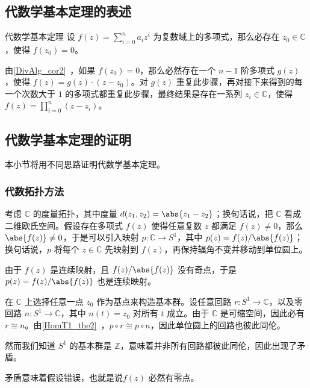 
\begin{issues}
\issueTODO
\end{issues}


\subsection{代数学基本定理的表述}

\begin{definition}{代数学基本定理}
设 $f(z)=\sum\limits_{i=0}^n a_iz^i$ 为复数域上的多项式，那么必存在 $z_0\in\mathbb{C}$，使得 $f(z_0)=0$。
\end{definition}

由\autoref{DivAlg_cor2}~，如果 $f(z_0)=0$，那么必然存在一个 $n-1$ 阶多项式 $g(z)$，使得 $f(z)=g(z)\cdot(z-z_0)$。对 $g(z)$ 重复此步骤，再对接下来得到的每一个次数大于 $1$ 的多项式都重复此步骤，最终结果是存在一系列 $z_i\in\mathbb{C}$，使得 $f(z)=\prod\limits_{i=0}^{n}(z-z_i)$。

\subsection{代数学基本定理的证明}

本小节将用不同思路证明代数学基本定理。

\subsubsection{代数拓扑方法}

考虑 $\mathbb{C}$ 的度量拓扑，其中度量 $d(z_1, z_2)=\abs{z_1-z_2}$；换句话说，把 $\mathbb{C}$ 看成二维欧氏空间。假设存在多项式 $f(z)$ 使得任意复数 $z$ 都满足 $f(z)\not=0$，那么 $\abs{f(z)}\not=0$，于是可以引入映射 $p:\mathbb{C}\rightarrow S^1$，其中 $p(z)=f(z)/\abs{f(z)}$；换句话说，$p$ 将每个 $z\in\mathbb{C}$ 先映射到 $f(z)$，再保持辐角不变并移动到单位圆上。

由于 $f(z)$ 是连续映射，且 $f(z)/\abs{f(z)}$ 没有奇点，于是 $p(z)=f(z)/\abs{f(z)}$ 也是连续映射。

在 $\mathbb{C}$ 上选择任意一点 $z_0$ 作为基点来构造基本群。设任意回路 $r:S^1\rightarrow\mathbb{C}$，以及零回路 $n:S^1\rightarrow\mathbb{C}$，其中 $n(t)=z_0$ 对所有 $t$ 成立。由于 $\mathbb{C}$ 是可缩空间，因此必有 $r\cong n$。由\autoref{HomT1_the2}~，$p\circ r\cong p\circ n$，因此单位圆上的回路也彼此同伦。

然而我们知道 $S^1$ 的基本群是 $\mathbb{Z}$，意味着并非所有回路都彼此同伦，因此出现了矛盾。

矛盾意味着假设错误，也就是说$f(z)$ 必然有零点。


